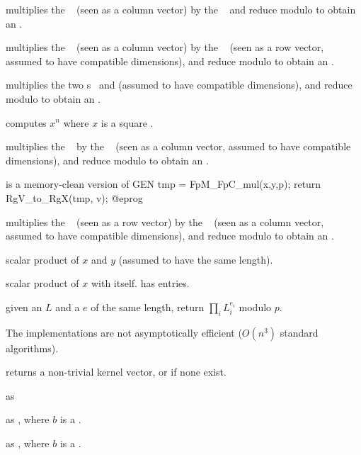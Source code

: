  multiplies the ~
(seen as a column vector) by the ~ and reduce modulo  to
obtain an .

 multiplies the ~
(seen as a column vector) by the ~ (seen as a row vector,
assumed to have compatible dimensions), and reduce modulo  to obtain
an .

 multiplies the two s~
and  (assumed to have compatible dimensions), and reduce modulo
 to obtain an .

 computes $x^n$ where $x$ is a
square .

 multiplies the ~
by the ~ (seen as a column vector, assumed to have compatible
dimensions), and reduce modulo  to obtain an .

 is a memory-clean
version of
\bprog
  GEN tmp = FpM_FpC_mul(x,y,p);
  return RgV_to_RgX(tmp, v);
@eprog

 multiplies the ~
(seen as a row vector) by the ~ (seen as a column vector,
assumed to have compatible dimensions), and reduce modulo  to obtain
an .

 scalar product of
$x$ and $y$ (assumed to have the same length).

 scalar product of $x$ with itself.
has  entries.

 given an  $L$
and a  $e$ of the same length, return $\prod_i L_i^{e_i}$ modulo $p$.

 The implementations are not
asymptotically efficient ($O(n^3)$ standard algorithms).

 returns a non-trivial kernel vector,
or  if none exist.

 as 

 as , where $b$ is a
.

 as , where $b$
is a .

